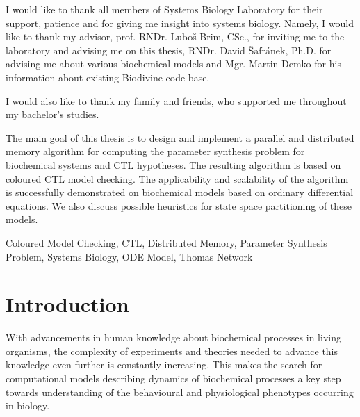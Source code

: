 \documentclass[12pt,oneside]{fithesis2}
\begin{document}
  \FrontMatter                    %
    \ThesisTitlePage                %
    \begin{ThesisDeclaration}       %
      \DeclarationText
      \AdvisorName
    \end{ThesisDeclaration}
    \begin{ThesisThanks}            %
      I would like to thank all members of Systems Biology Laboratory for their support, patience and for giving me insight into systems biology. Namely, I would like to thank my advisor, prof. RNDr. Luboš Brim, CSc., for inviting me to the laboratory and advising me on this thesis, RNDr. David Šafránek, Ph.D. for advising me about various biochemical models and  Mgr. Martin Demko for his information about existing Biodivine code base.
      
      I would also like to thank my family and friends, who supported me throughout my bachelor's studies.
    \end{ThesisThanks}
    \begin{ThesisAbstract}          %
      The main goal of this thesis is to design and implement a parallel and distributed memory algorithm for computing the parameter synthesis problem for biochemical systems and CTL hypotheses. The resulting algorithm is based on coloured CTL model checking. The applicability and scalability of the algorithm is successfully demonstrated on biochemical models based on ordinary differential equations. We also discuss possible heuristics for state space partitioning of these models.
    \end{ThesisAbstract}
    \begin{ThesisKeyWords}          %
		Coloured Model Checking, CTL, Distributed Memory, Parameter Synthesis Problem, Systems Biology, ODE Model, Thomas Network
    \end{ThesisKeyWords}
    \tableofcontents                %
  
  \MainMatter                     %
    \chapter{Introduction}          %
	
		With advancements in human knowledge about biochemical processes in living organisms, the complexity of experiments and theories needed to advance this knowledge even further is constantly increasing. This makes the search for computational models describing dynamics of biochemical processes a key step towards understanding of the behavioural and physiological phenotypes occurring in biology.
		
\end{document}
